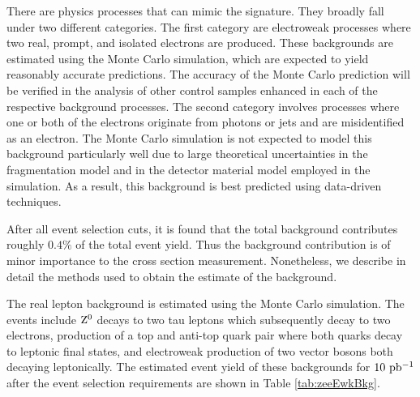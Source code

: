 \documentclass{cmspaper}
\begin{document}
\label{sec:Backgrounds}
There are physics processes that can mimic the \Z\To\Ep\Em signature. They broadly fall under two different categories. The first category are electroweak processes where two real, prompt, and isolated electrons are produced. These backgrounds are estimated using the Monte Carlo simulation, which are expected to yield reasonably accurate predictions. The accuracy of the Monte Carlo prediction will be verified in the analysis of other control samples enhanced in each of the respective background processes. The second category involves processes where one or both of the electrons originate from photons or jets and are misidentified as an electron. The Monte Carlo simulation is not expected to model this background particularly well due to large theoretical uncertainties in the fragmentation model and in the detector material model employed in the simulation. As a result, this background is best predicted using data-driven techniques. 

After all event selection cuts, it is found that the total background contributes roughly $0.4\%$ of the total event yield. Thus the background contribution is of minor importance to the cross section measurement. Nonetheless, we describe in detail the methods used to obtain the estimate of the background.


The real lepton background is estimated using the Monte Carlo simulation. The events include $\mathrm{Z^0}$ decays to two tau leptons which subsequently decay to two electrons, production of a top and anti-top quark pair where both quarks decay to leptonic final states, and electroweak production of two vector bosons both decaying leptonically. The estimated event yield of these backgrounds for $10\ \mathrm{pb^{-1}}$ after the \Z\To\Ep\Em event selection requirements are shown in Table \ref{tab:zeeEwkBkg}. 
\end{document}
